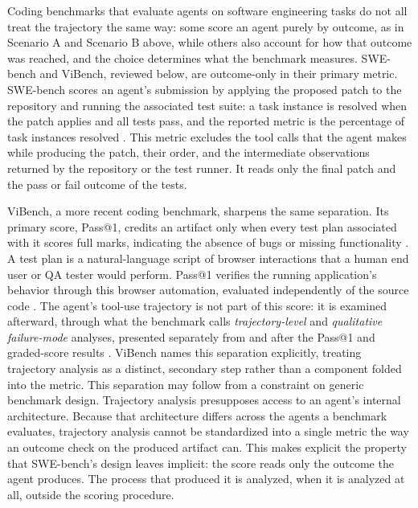 Coding benchmarks that evaluate agents on software engineering tasks do not all treat the trajectory the same way: some score an agent purely by outcome, as in Scenario A and Scenario B above, while others also account for how that outcome was reached, and the choice determines what the benchmark measures. SWE-bench and ViBench, reviewed below, are outcome-only in their primary metric. SWE-bench scores an agent's submission by applying the proposed patch to the repository and running the associated test suite: a task instance is resolved when the patch applies and all tests pass, and the reported metric is the percentage of task instances resolved \cite{jimenezSWEbenchCanLanguage2024a}. This metric excludes the tool calls that the agent makes while producing the patch, their order, and the intermediate observations returned by the repository or the test runner. It reads only the final patch and the pass or fail outcome of the tests.

ViBench, a more recent coding benchmark, sharpens the same separation. Its primary score, Pass@1, credits an artifact only when every test plan associated with it scores full marks, indicating the absence of bugs or missing functionality \cite{zhongViBenchBenchmarkVibe2026a}. A test plan is a natural-language script of browser interactions that a human end user or QA tester would perform. Pass@1 verifies the running application's behavior through this browser automation, evaluated independently of the source code \cite{zhongViBenchBenchmarkVibe2026a}. The agent's tool-use trajectory is not part of this score: it is examined afterward, through what the benchmark calls \emph{trajectory-level} and \emph{qualitative failure-mode} analyses, presented separately from and after the Pass@1 and graded-score results \cite{zhongViBenchBenchmarkVibe2026a}. ViBench names this separation explicitly, treating trajectory analysis as a distinct, secondary step rather than a component folded into the metric. This separation may follow from a constraint on generic benchmark design. Trajectory analysis presupposes access to an agent's internal architecture. Because that architecture differs across the agents a benchmark evaluates, trajectory analysis cannot be standardized into a single metric the way an outcome check on the produced artifact can. This makes explicit the property that SWE-bench's design leaves implicit: the score reads only the outcome the agent produces. The process that produced it is analyzed, when it is analyzed at all, outside the scoring procedure.
